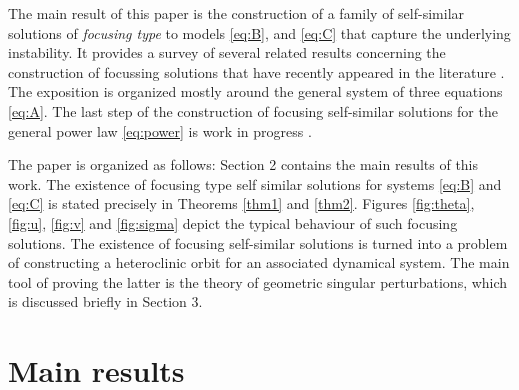 \documentclass[graybox]{svmult}
\begin{document}
The main result of this paper is the construction of a family of self-similar solutions of {\it focusing type} to models \eqref{eq:B}, and \eqref{eq:C} that capture the underlying instability. It provides a survey of several related results concerning the construction of focussing solutions that
have recently appeared in the literature \cite{KOT14,KLT_2016,LT16}. The exposition is organized mostly around the general system of three equations 
 \eqref{eq:A}. The last step of the construction of focusing self-similar solutions for the general power law \eqref{eq:power} is work in progress \cite{LT16_2}. 

The paper is organized as follows: Section 2 contains the main results of this work. The existence of focusing type self similar solutions for systems \eqref{eq:B} and \eqref{eq:C} is stated precisely in Theorems \ref{thm1} and \ref{thm2}. Figures \ref{fig:theta}, \ref{fig:u}, \ref{fig:v} and \ref{fig:sigma} depict the typical behaviour of such focusing solutions.  
The existence of focusing self-similar solutions is turned into a problem of constructing a heteroclinic orbit for an associated dynamical system. 
The main tool of proving the latter is the theory of geometric singular perturbations, \cite{fenichel_geometric_1979} which is  discussed briefly in Section 3. 


\section{Main results}
\end{document}
